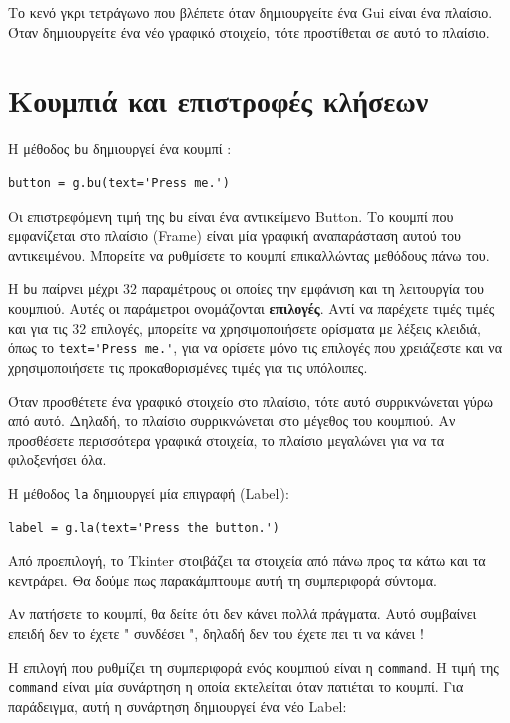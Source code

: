 \documentclass[10pt]{book}
\begin{document}
Το κενό γκρι τετράγωνο που βλέπετε όταν δημιουργείτε ένα  Gui  είναι ένα πλαίσιο.  
Όταν δημιουργείτε ένα νέο γραφικό στοιχείο, τότε προστίθεται σε αυτό το πλαίσιο.



\section{Κουμπιά και επιστροφές κλήσεων}

Η μέθοδος  {\tt bu}  δημιουργεί ένα κουμπί :

\begin{verbatim}
button = g.bu(text='Press me.')
\end{verbatim}
%
 Οι επιστρεφόμενη τιμή της  {\tt bu}  είναι ένα αντικείμενο  Button.   
Το κουμπί που εμφανίζεται στο πλαίσιο  (Frame)  είναι μία γραφική αναπαράσταση 
αυτού του αντικειμένου.  Μπορείτε να ρυθμίσετε το κουμπί επικαλλώντας μεθόδους πάνω του.

Η  {\tt bu}  παίρνει μέχρι 32 παραμέτρους οι οποίες την εμφάνιση και τη λειτουργία 
του κουμπιού.  Αυτές οι παράμετροι ονομάζονται {\bf επιλογές}.  Αντί να παρέχετε 
τιμές τιμές και για τις 32 επιλογές, μπορείτε να χρησιμοποιήσετε ορίσματα με λέξεις 
κλειδιά, όπως το  \verb"text='Press me.'",  για να ορίσετε μόνο τις επιλογές που 
χρειάζεστε και να χρησιμοποιήσετε τις προκαθορισμένες τιμές για τις υπόλοιπες.

Όταν προσθέτετε ένα γραφικό στοιχείο στο πλαίσιο, τότε αυτό συρρικνώνεται γύρω από αυτό.  
Δηλαδή, το πλαίσιο συρρικνώνεται στο μέγεθος του κουμπιού.  Αν προσθέσετε περισσότερα 
γραφικά στοιχεία, το πλαίσιο μεγαλώνει για να τα φιλοξενήσει όλα.

Η μέθοδος  {\tt la}  δημιουργεί μία επιγραφή (Label):

\begin{verbatim}
label = g.la(text='Press the button.')
\end{verbatim}
%
 Από προεπιλογή, το  Tkinter  στοιβάζει τα στοιχεία από πάνω προς τα κάτω και 
τα κεντράρει.  Θα δούμε πως παρακάμπτουμε αυτή τη συμπεριφορά σύντομα.

Αν πατήσετε το κουμπί, θα δείτε ότι δεν κάνει πολλά πράγματα.  
Αυτό συμβαίνει επειδή δεν το έχετε  " συνδέσει ",  δηλαδή δεν του έχετε πει 
τι να κάνει !

 Η επιλογή που ρυθμίζει τη συμπεριφορά ενός κουμπιού είναι η  {\tt command}.   
Η τιμή της  {\tt command}  είναι μία συνάρτηση η οποία εκτελείται όταν πατιέται το κουμπί.  Για παράδειγμα, αυτή η συνάρτηση δημιουργεί ένα νέο  Label:
\end{document}
